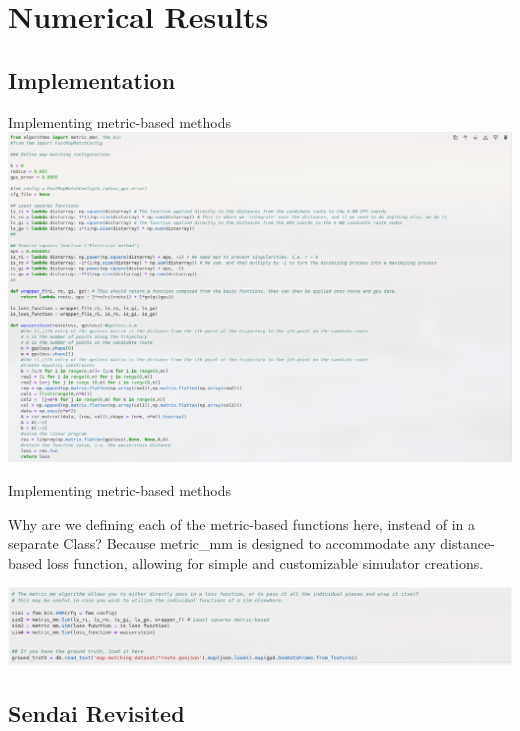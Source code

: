 \documentclass[aspectratio=169, bigfiles]{beamer}
\begin{document}
\section{Numerical Results}

\subsection{Implementation}

\begin{frame}{Implementing metric-based methods}
\vspace{-.1cm}
\centering
\includegraphics[scale=0.27]{Jupyter Notebook LaTeX/codeexample.png}

\end{frame}

\begin{frame}{Implementing metric-based methods}

Why are we defining each of the metric-based functions here, instead of in a separate Class? Because metric\_mm is designed to accommodate any distance-based loss function, allowing for simple and customizable simulator creations.

\centering
\includegraphics[scale=0.5]{Jupyter Notebook LaTeX/codeexample1.png}
\end{frame}

\subsection{Sendai Revisited}
\end{document}

